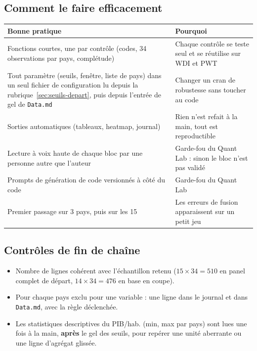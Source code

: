 \documentclass[21pt,a4paper]{article}
\begin{document}
	\subsection{Comment le faire efficacement}
	
	\begin{center}
		\small
		\begin{tabularx}{\textwidth}{@{}L{7.2cm}Y@{}}
			\toprule
			\textbf{Bonne pratique} & \textbf{Pourquoi} \\
			\midrule
			Fonctions courtes, une par contrôle (codes, 34 observations par pays, complétude) & Chaque contrôle se teste seul et se réutilise sur WDI et PWT \\
			\addlinespace
			Tout paramètre (seuils, fenêtre, liste de pays) dans un seul fichier de configuration lu depuis la rubrique~\ref{sec:seuils-depart}, puis depuis l'entrée de gel de \texttt{Data.md} & Changer un cran de robustesse sans toucher au code \\
			\addlinespace
			Sorties automatiques (tableaux, heatmap, journal) & Rien n'est refait à la main, tout est reproductible \\
			\addlinespace
			Lecture à voix haute de chaque bloc par une personne autre que l'auteur & Garde-fou du Quant Lab : sinon le bloc n'est pas validé \\
			\addlinespace
			Prompts de génération de code versionnés à côté du code & Garde-fou du Quant Lab \\
			\addlinespace
			Premier passage sur 3 pays, puis sur les 15 & Les erreurs de fusion apparaissent sur un petit jeu \\
			\bottomrule
		\end{tabularx}
	\end{center}
	
	\subsection{Contrôles de fin de chaîne}
	
	\begin{itemize}
		\item Nombre de lignes cohérent avec l'échantillon retenu ($15 \times 34 = 510$ en panel complet de départ, $14 \times 34 = 476$ en base en coupe).
		\item Pour chaque pays exclu pour une variable : une ligne dans le journal et dans \texttt{Data.md}, avec la règle déclenchée.
		\item Les statistiques descriptives du PIB/hab. (min, max par pays) sont lues une fois à la main, \textbf{après} le gel des seuils, pour repérer une unité aberrante ou une ligne d'agrégat glissée.
	\end{itemize}
	
\end{document}
